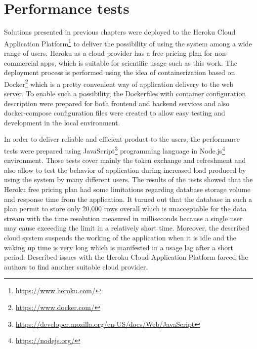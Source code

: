 \section{Performance tests}\label{sec:performance-tests}
Solutions presented in previous chapters were deployed to the Heroku Cloud Application Platform\footnote{\url{https://www.heroku.com/}} to deliver the possibility of using the system among a wide range of users.
Heroku as a cloud provider has a free pricing plan for non-commercial apps, which is suitable for scientific usage such as this work.
The deployment process is performed using the idea of containerization based on Docker\footnote{\url{https://www.docker.com/}} which is a pretty convenient way of application delivery to the web server.
To enable such a possibility, the Dockerfiles with container configuration description were prepared for both frontend and backend services and also docker-compose configuration files were created to allow easy testing and development in the local environment.

In order to deliver reliable and efficient product to the users, the performance tests were prepared using JavaScript\footnote{\url{https://developer.mozilla.org/en-US/docs/Web/JavaScript}} programming language in Node.js\footnote{\url{https://nodejs.org/}} environment.
Those tests cover mainly the token exchange and refreshment and also allow to test the behavior of application during increased load produced by using the system by many different users.
The results of the tests showed that the Heroku free pricing plan had some limitations regarding database storage volume and response time from the application.
It turned out that the database in such a plan permit to store only 20,000 rows overall which is unacceptable for the data stream with the time resolution measured in milliseconds because a single user may cause exceeding the limit in a relatively short time.
Moreover, the described cloud system suspends the working of the application when it is idle and the waking up time is very long which is manifested in a usage lag after a short period.
Described issues with the Heroku Cloud Application Platform forced the authors to find another suitable cloud provider.